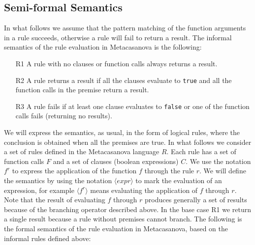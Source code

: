 \subsection{Semi-formal Semantics}
In what follows we assume that the pattern matching of the function arguments in a rule succeeds, otherwise a rule will fail to return a result.
The informal semantics of the rule evaluation in Metacasanova is the following:
\begin{enumerate}
	\item[R1] A rule with no clauses or function calls always returns a result.
	\item[R2] A rule returns a result if all the clauses evaluate to \texttt{true} and all the function calls in the premise return a result.
	\item[R3] A rule fails if at least one clause evaluates to \texttt{false} or one of the function calls fails (returning no results).
\end{enumerate}
We will express the semantics, as usual, in the form of logical rules, where the conclusion is obtained when all the premises are true.
In what follows we consider a set of rules defined in the Metacasanova language $R$. Each rule has a set of function calls $F$ and a set of clauses (boolean expressions) $C$. We use the notation $f^{r}$ to express the application of the function $f$ through the rule $r$. We will define the semantics by using the notation $\langle expr \rangle$ to mark the evaluation of an expression, for example $\langle f^{r} \rangle$ means evaluating the application of $f$ through $r$. Note that the result of evaluating $f$ through $r$ produces generally a set of results because of the branching operator described above. In the base case R1 we return a single result because a rule without premises cannot branch. The following is the formal semantics of the rule evaluation in Metacasanova, based on the informal rules defined above:


